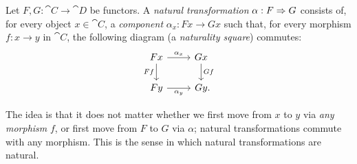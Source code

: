 \begin{dfn}\label{def:natural transformation}
  Let $F, G: \cat{C}\to\cat{D}$ be functors. A \emph{natural transformation}
  $\alpha: F\Rightarrow G$ consists of, for every object $x\in\cat{C}$, a
  \emph{component} $\alpha_x: Fx\to Gx$ such that, for every morphism $f: x\to
  y$ in $\cat{C}$, the following diagram (a \emph{naturality square}) commutes:
  \[
    \begin{tikzcd}
      Fx\ar[r, "\alpha_x"]\ar[d, "Ff"'] & Gx\ar[d, "Gf"] \\
      Fy\ar[r, "\alpha_y"'] & Gy\punctuation{.}
    \end{tikzcd}
  \]
\end{dfn}

The idea is that it does not matter whether we first move from $x$ to $y$ via
\emph{any morphism} $f$, or first move from $F$ to $G$ via $\alpha$; natural
transformations commute with any morphism. This is the sense in which natural
transformations are natural.

